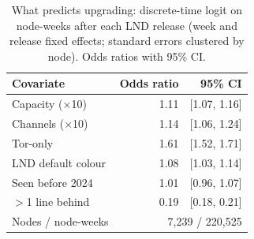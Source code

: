 \begin{table}[t]
\centering\small
\caption{What predicts upgrading: discrete-time logit on node-weeks after each LND release (week and release fixed effects; standard errors clustered by node). Odds ratios with 95\% CI.}
\label{tab:hazard}
\begin{tabular}{lrr}
\toprule
Covariate & Odds ratio & 95\% CI \\
\midrule
Capacity ($\times$10) & 1.11 & [1.07, 1.16] \\
Channels ($\times$10) & 1.14 & [1.06, 1.24] \\
Tor-only & 1.61 & [1.52, 1.71] \\
LND default colour & 1.08 & [1.03, 1.14] \\
Seen before 2024 & 1.01 & [0.96, 1.07] \\
$>$1 line behind & 0.19 & [0.18, 0.21] \\
\midrule
Nodes / node-weeks & \multicolumn{2}{r}{7,239 / 220,525} \\
\bottomrule
\end{tabular}
\end{table}
